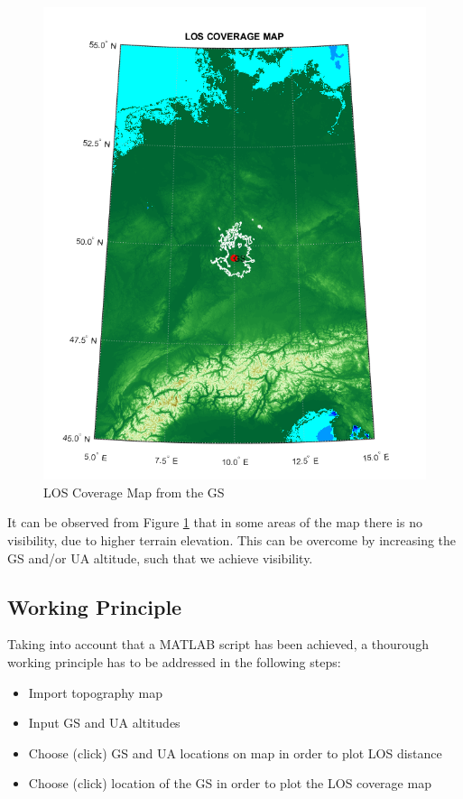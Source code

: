 \begin{figure}[h]
	\centering
	\includegraphics[scale=0.5]{figures/gs_coverage_map.png}
	\caption{LOS Coverage Map from the GS}
   	\label{fig:los_area}
\end{figure}

It can be observed from Figure \ref{fig:los_area} that in some areas of the map there is no visibility, due to higher terrain elevation. This can be overcome by increasing the GS and/or UA altitude, such that we achieve visibility.  

\subsection{Working Principle}
Taking into account that a MATLAB script has been achieved, a thourough working principle has to be addressed in the following steps:
\begin{itemize}
	\item Import topography map 
	\item Input GS and UA altitudes
	\item Choose (click) GS and UA locations on map in order to plot LOS distance
	\item Choose (click) location of the GS in order to plot the LOS coverage map
\end{itemize}